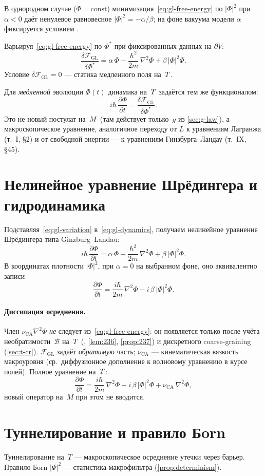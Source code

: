 В однородном случае ($\Phi=\mathrm{const}$) минимизация~\eqref{eq:gl-free-energy} по $|\Phi|^2$
при $\alpha<0$ даёт ненулевое равновесное $|\Phi|^2=-\alpha/\beta$;
на фоне вакуума модели $\alpha$ фиксируется условием .

Варьируя~\eqref{eq:gl-free-energy} по $\Phi^*$ при фиксированных данных на $\partial V$:
\begin{equation}
\label{eq:gl-variation}
  \frac{\delta\mathcal{F}_{\mathrm{GL}}}{\delta\Phi^*}
  = \alpha\,\Phi
  - \frac{\hbar^2}{2m}\,\nabla^2\Phi
  + \beta\,|\Phi|^2\Phi.
\end{equation}
Условие $\delta\mathcal{F}_{\mathrm{GL}}=0$ --- статика медленного поля на~$T$.

Для \emph{медленной} эволюции $\Phi(t)$ динамика на~$T$ задаётся тем же функционалом:
\begin{equation}
\label{eq:gl-dynamics}
  i\hbar\,\frac{\partial\Phi}{\partial t}
  = \frac{\delta\mathcal{F}_{\mathrm{GL}}}{\delta\Phi^*}.
\end{equation}
Это не новый постулат на~$M$ (там действует только~$g$ из \cref{sec:g-law}),
а макроскопическое уравнение, аналогичное переходу от $L$ к уравнениям Лагранжа
(т.~I, \S2) и от свободной энергии --- к уравнениям Гинзбурга--Ландау (т.~IX, \S45).

\section{Нелинейное уравнение Шрёдингера и гидродинамика}
\label{sec:nlse-hydro}

Подставляя~\eqref{eq:gl-variation} в~\eqref{eq:gl-dynamics}, получаем нелинейное уравнение
Шрёдингера типа Ginzburg--Landau:
\begin{equation}
\label{eq:nlse-gl}
  i\hbar\,\frac{\partial\Phi}{\partial t}
  = \alpha\,\Phi
  - \frac{\hbar^2}{2m}\,\nabla^2\Phi
  + \beta\,|\Phi|^2\Phi.
\end{equation}
В координатах плотности $|\Phi|^2$, при $\alpha=0$ на выбранном фоне, оно эквивалентно записи
\begin{equation}
\label{eq:nlse-gl-real}
  \frac{\partial\Phi}{\partial t}
  = \frac{i\hbar}{2m}\,\nabla^2\Phi
  - i\,\beta\,|\Phi|^2\Phi.
\end{equation}

\paragraph{Диссипация осреднения.}
Член $\nu_{\mathrm{CA}}\nabla^2\Phi$ \emph{не} следует из~\eqref{eq:gl-free-energy}:
он появляется только после учёта необратимости~$\mathcal{B}$ на~$T$
(, \cref{lem:236}, \cref{prop:237}) и дискретного coarse-graining (\cref{sec:t-cr}).
$\mathcal{F}_{\mathrm{GL}}$ задаёт \emph{обратимую} часть; $\nu_{\mathrm{CA}}$ --- кинематическая вязкость
макроуровня (ср.~диффузионное дополнение к волновому уравнению в курсе полей).
Полное уравнение на~$T$:
\[
  \frac{\partial\Phi}{\partial t}
  = \frac{i\hbar}{2m}\,\nabla^2\Phi
  - i\,\beta\,|\Phi|^2\Phi
  + \nu_{\mathrm{CA}}\,\nabla^2\Phi,
\]
новый оператор на~$M$ при этом не вводится.

\section{Туннелирование и правило Бorn}

Туннелирование на~$T$ --- макроскопическое осреднение утечки через барьер.
Правило Бorn $|\Psi|^2$ --- статистика макрофильтра (\cref{prop:determinism}).
